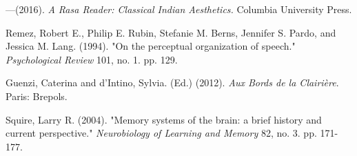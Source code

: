\begin{thebibliography}{99}
---\kern3pt(2016). \textsl{A Rasa Reader: Classical Indian Aesthetics.} Columbia University Press.

Remez, Robert E., Philip E. Rubin, Stefanie M. Berns, Jennifer S. Pardo, and Jessica M. Lang. (1994). "On the perceptual organization of speech." \textsl{Psychological Review} 101, no. 1. pp. 129.

Guenzi, Caterina and d'Intino, Sylvia. (Ed.) (2012). \textsl{Aux Bords de la Clairière}. Paris: Brepols.

Squire, Larry R. (2004). "Memory systems of the brain: a brief history and current perspective." \textsl{Neurobiology of Learning and Memory} 82, no. 3. pp. 171-177.
\end{thebibliography}

